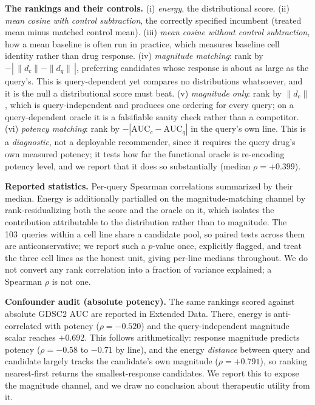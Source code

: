 \documentclass[11pt,letterpaper]{article}
\newcommand{\NCQUERIES}{103}
\begin{document}
\textbf{The rankings and their controls.} (i) \emph{energy}, the distributional score. (ii)
\emph{mean cosine with control subtraction}, the correctly specified incumbent (treated mean minus
matched control mean). (iii) \emph{mean cosine without control subtraction}, how a mean baseline
is often run in practice, which measures baseline cell identity rather than drug response. (iv)
\emph{magnitude matching}: rank by $-|\,\|d_c\| - \|d_q\|\,|$, preferring candidates whose response
is about as large as the query's. This is query-dependent yet compares no distributions
whatsoever, and it is the null a distributional score must beat. (v) \emph{magnitude only}: rank by
$\|d_c\|$, which is query-independent and produces one ordering for every query; on a
query-dependent oracle it is a falsifiable sanity check rather than a competitor. (vi)
\emph{potency matching}: rank by $-|\mathrm{AUC}_c - \mathrm{AUC}_q|$ in the query's own line. This
is a \emph{diagnostic}, not a deployable recommender, since it requires the query drug's own
measured potency; it tests how far the functional oracle is re-encoding potency level, and we
report that it does so substantially (median $\rho = +0.399$).

\textbf{Reported statistics.} Per-query Spearman correlations summarized by their median. Energy is
additionally partialled on the magnitude-matching channel by rank-residualizing both the score and
the oracle on it, which isolates the contribution attributable to the distribution rather than to
magnitude. The \NCQUERIES\ queries within a cell line share a candidate pool, so paired tests
across them are anticonservative; we report such a $p$-value once, explicitly flagged, and treat
the three cell lines as the honest unit, giving per-line medians throughout. We do not convert any
rank correlation into a fraction of variance explained; a Spearman $\rho$ is not one.

\textbf{Confounder audit (absolute potency).} The same rankings scored against absolute GDSC2 AUC
are reported in Extended Data. There, energy is anti-correlated with potency ($\rho = -0.520$) and
the query-independent magnitude scalar reaches $+0.692$. This follows arithmetically: response
magnitude predicts potency ($\rho = -0.58$ to $-0.71$ by line), and the energy \emph{distance}
between query and candidate largely tracks the candidate's own magnitude ($\rho = +0.791$), so
ranking nearest-first returns the smallest-response candidates. We report this to expose the
magnitude channel, and we draw no conclusion about therapeutic utility from it.
\end{document}
